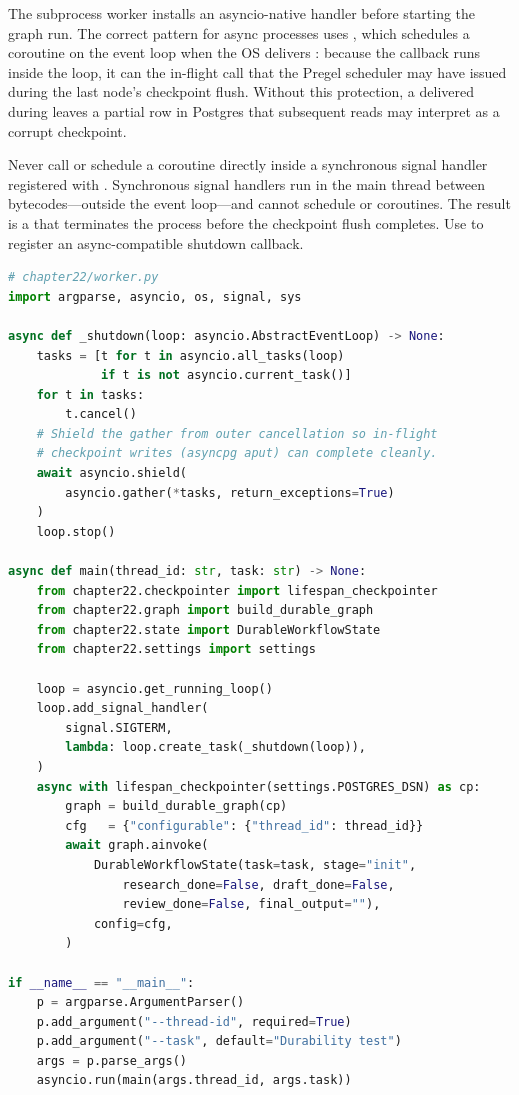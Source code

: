 The subprocess worker installs an asyncio-native  handler
before starting the graph run. The correct pattern for async processes
uses , which schedules a coroutine on
the event loop when the OS delivers : because the callback
runs inside the loop, it can  the in-flight  call
that the Pregel scheduler may have issued during the last node's checkpoint
flush. Without this protection, a  delivered during
 leaves a partial row in Postgres that subsequent reads may
interpret as a corrupt checkpoint.

\begin{warningbox}
Never call  or schedule a coroutine directly
inside a synchronous signal handler registered with
. Synchronous signal handlers run in the main
thread between bytecodes---outside the event loop---and cannot schedule
or  coroutines. The result is a  that terminates the process before the checkpoint
flush completes. Use  to register an
async-compatible shutdown callback.
\end{warningbox}

\begin{lstlisting}[language=Python,
  caption={worker.py: asyncio-native SIGTERM handler shielding the
           in-flight checkpoint write; subprocess entry point},
  label={lst:durable-worker}]
# chapter22/worker.py
import argparse, asyncio, os, signal, sys

async def _shutdown(loop: asyncio.AbstractEventLoop) -> None:
    tasks = [t for t in asyncio.all_tasks(loop)
             if t is not asyncio.current_task()]
    for t in tasks:
        t.cancel()
    # Shield the gather from outer cancellation so in-flight
    # checkpoint writes (asyncpg aput) can complete cleanly.
    await asyncio.shield(
        asyncio.gather(*tasks, return_exceptions=True)
    )
    loop.stop()

async def main(thread_id: str, task: str) -> None:
    from chapter22.checkpointer import lifespan_checkpointer
    from chapter22.graph import build_durable_graph
    from chapter22.state import DurableWorkflowState
    from chapter22.settings import settings

    loop = asyncio.get_running_loop()
    loop.add_signal_handler(
        signal.SIGTERM,
        lambda: loop.create_task(_shutdown(loop)),
    )
    async with lifespan_checkpointer(settings.POSTGRES_DSN) as cp:
        graph = build_durable_graph(cp)
        cfg   = {"configurable": {"thread_id": thread_id}}
        await graph.ainvoke(
            DurableWorkflowState(task=task, stage="init",
                research_done=False, draft_done=False,
                review_done=False, final_output=""),
            config=cfg,
        )

if __name__ == "__main__":
    p = argparse.ArgumentParser()
    p.add_argument("--thread-id", required=True)
    p.add_argument("--task", default="Durability test")
    args = p.parse_args()
    asyncio.run(main(args.thread_id, args.task))
\end{lstlisting}

